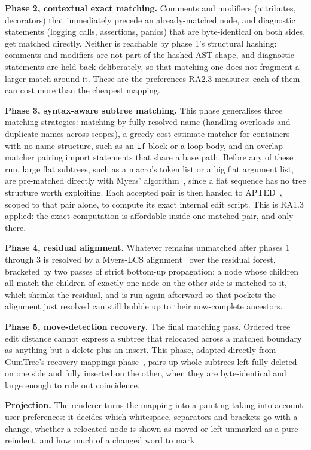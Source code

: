 \documentclass[sigconf,review]{acmart}
\begin{document}
\textbf{Phase 2, contextual exact matching.} Comments and modifiers (attributes, decorators) that
immediately precede an already-matched node, and diagnostic statements (logging calls, assertions,
panics) that are byte-identical on both sides, get matched directly. Neither is reachable by
phase 1's structural hashing: comments and modifiers are not part of the hashed AST shape, and
diagnostic statements are held back deliberately, so that matching one does not fragment a larger
match around it. These are the preferences RA2.3 measures: each of them can cost more than the
cheapest mapping.

\textbf{Phase 3, syntax-aware subtree matching.} This phase generalises three matching strategies:
matching by fully-resolved name (handling overloads and duplicate names across scopes), a greedy
cost-estimate matcher for containers with no name structure, such as an \texttt{if} block or a
loop body, and an overlap matcher pairing import statements that share a base path. Before any of
these run, large flat subtrees, such as a macro's token list or a big flat argument list, are
pre-matched directly with Myers' algorithm~\cite{myers-1986}, since a flat sequence has no tree
structure worth exploiting. Each accepted pair is then handed to APTED~\cite{apted-2015}, scoped
to that pair alone, to compute its exact internal edit script. This is RA1.3 applied: the exact
computation is affordable inside one matched pair, and only there.

\textbf{Phase 4, residual alignment.} Whatever remains unmatched after phases 1 through 3 is
resolved by a Myers-LCS alignment~\cite{myers-1986} over the residual forest, bracketed by two
passes of strict bottom-up propagation: a node whose children all match the children of exactly
one node on the other side is matched to it, which shrinks the residual, and is run again
afterward so that pockets the alignment just resolved can still bubble up to their now-complete
ancestors.

\textbf{Phase 5, move-detection recovery.} The final matching pass. Ordered tree edit distance
cannot express a subtree that relocated across a matched boundary as anything but a delete plus
an insert. This phase, adapted directly from GumTree's recovery-mappings
phase~\cite{gumtreediff-2014}, pairs up whole subtrees left fully deleted on one side and fully
inserted on the other, when they are byte-identical and large enough to rule out coincidence.

\textbf{Projection.} The renderer turns the mapping into a painting taking into account user
preferences: it decides which whitespace, separators and brackets go with a change, whether a
relocated node is shown as moved or left unmarked as a pure reindent, and how much of a changed
word to mark.
\end{document}
